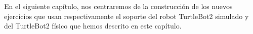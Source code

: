 En el siguiente capítulo, nos centraremos de la construcción de los nuevos ejercicios que usan respectivamente el soporte del robot TurtleBot2 simulado y del TurtleBot2 físico que hemos descrito en este capítulo.




